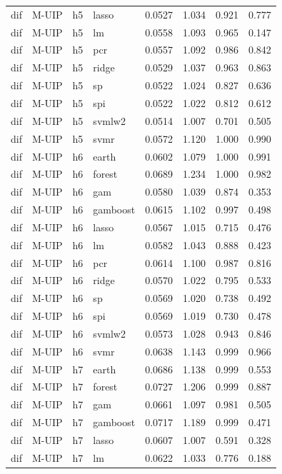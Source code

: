 \begin{ThreePartTable}
\begin{longtable}[t]{llclcccc}
dif & M-UIP & h5 & lasso & 0.0527 & 1.034 & 0.921 & 0.777\\
dif & M-UIP & h5 & lm & 0.0558 & 1.093 & 0.965 & 0.147\\
dif & M-UIP & h5 & pcr & 0.0557 & 1.092 & 0.986 & 0.842\\
dif & M-UIP & h5 & ridge & 0.0529 & 1.037 & 0.963 & 0.863\\
dif & M-UIP & h5 & sp & 0.0522 & 1.024 & 0.827 & 0.636\\
dif & M-UIP & h5 & spi & 0.0522 & 1.022 & 0.812 & 0.612\\
dif & M-UIP & h5 & svmlw2 & 0.0514 & 1.007 & 0.701 & 0.505\\
dif & M-UIP & h5 & svmr & 0.0572 & 1.120 & 1.000 & 0.990\\
\addlinespace
dif & M-UIP & h6 & earth & 0.0602 & 1.079 & 1.000 & 0.991\\
dif & M-UIP & h6 & forest & 0.0689 & 1.234 & 1.000 & 0.982\\
dif & M-UIP & h6 & gam & 0.0580 & 1.039 & 0.874 & 0.353\\
dif & M-UIP & h6 & gamboost & 0.0615 & 1.102 & 0.997 & 0.498\\
dif & M-UIP & h6 & lasso & 0.0567 & 1.015 & 0.715 & 0.476\\
dif & M-UIP & h6 & lm & 0.0582 & 1.043 & 0.888 & 0.423\\
dif & M-UIP & h6 & pcr & 0.0614 & 1.100 & 0.987 & 0.816\\
dif & M-UIP & h6 & ridge & 0.0570 & 1.022 & 0.795 & 0.533\\
dif & M-UIP & h6 & sp & 0.0569 & 1.020 & 0.738 & 0.492\\
dif & M-UIP & h6 & spi & 0.0569 & 1.019 & 0.730 & 0.478\\
dif & M-UIP & h6 & svmlw2 & 0.0573 & 1.028 & 0.943 & 0.846\\
dif & M-UIP & h6 & svmr & 0.0638 & 1.143 & 0.999 & 0.966\\
\addlinespace
dif & M-UIP & h7 & earth & 0.0686 & 1.138 & 0.999 & 0.553\\
dif & M-UIP & h7 & forest & 0.0727 & 1.206 & 0.999 & 0.887\\
dif & M-UIP & h7 & gam & 0.0661 & 1.097 & 0.981 & 0.505\\
dif & M-UIP & h7 & gamboost & 0.0717 & 1.189 & 0.999 & 0.471\\
dif & M-UIP & h7 & lasso & 0.0607 & 1.007 & 0.591 & 0.328\\
dif & M-UIP & h7 & lm & 0.0622 & 1.033 & 0.776 & 0.188\\

\end{longtable}
\end{ThreePartTable}
